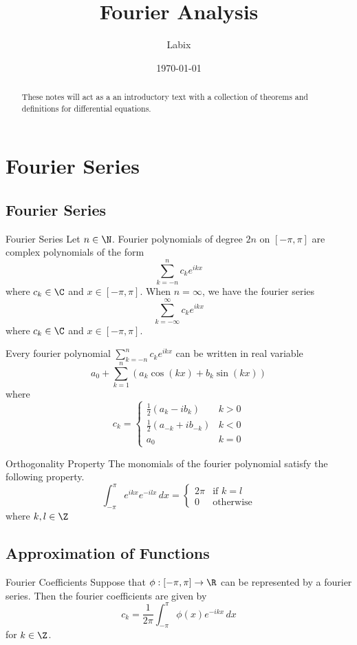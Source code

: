 \documentclass[a4paper]{article}
\title{Fourier Analysis}
\author{Labix}
\date{\today}
\begin{document}
\maketitle
\begin{abstract}
These notes will act as a an introductory text with a collection of theorems and definitions for differential equations. 
\end{abstract}
\tableofcontents
\pagebreak

\section{Fourier Series}
\subsection{Fourier Series}
\begin{defn}{Fourier Series}{} Let $n\in\N$. Fourier polynomials of degree $2n$ on $[-\pi,\pi]$ are complex polynomials of the form $$\sum_{k=-n}^nc_ke^{ikx}$$ where $c_k\in\C$ and $x\in[-\pi,\pi]$. When $n=\infty$, we have the fourier series $$\sum_{k=-\infty}^\infty c_ke^{ikx}$$ where $c_k\in\C$ and $x\in[-\pi,\pi]$. 
\end{defn}

\begin{prp}{}{} Every fourier polynomial $\sum_{k=-n}^nc_ke^{ikx}$ can be written in real variable $$a_0+\sum_{k=1}^n(a_k\cos(kx)+b_k\sin(kx))$$ where $$c_k=\begin{cases}
\frac{1}{2}(a_k-ib_k) & k>0\\
\frac{1}{2}(a_{-k}+ib_{-k}) & k<0\\
a_0 & k=0
\end{cases}$$
\end{prp}

\begin{lmm}{Orthogonality Property}{} The monomials of the fourier polynomial satisfy the following property. $$\int_{-\pi}^\pi e^{ikx}e^{-ilx}\,dx=\begin{cases}
2\pi & \text{if }k=l\\
0 & \text{otherwise}
\end{cases}$$ where $k,l\in\Z$
\end{lmm}

\subsection{Approximation of Functions}
\begin{prp}{Fourier Coefficients}{} Suppose that $\phi:[-\pi,\pi]\to\R$ can be represented by a fourier series. Then the fourier coefficients are given by $$c_k=\frac{1}{2\pi}\int_{-\pi}^\pi\phi(x)e^{-ikx}\,dx$$ for $k\in\Z$. 
\end{prp}
\end{document}

